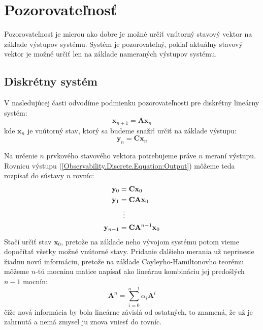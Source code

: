 \documentclass[a4paper, 10pt, ]{article}
\begin{document}
\section{Pozorovateľnosť}

Pozorovateľnosť je mierou ako dobre je možné určiť vnútorný stavový vektor na základe výstupov systému. Systém je pozorovateľný, pokiaľ aktuálny stavový vektor je možné určiť len na základe nameraných výstupov systému. 


\subsection{Diskrétny systém}

V nasledujúcej časti odvodíme podmienku pozorovateľnosti pre diskrétny lineárny systém:
\begin{equation}
    \label{Observability.Discrete.Equation:StateSpaceModel}
    \bm{x}_{n + 1} = \bm{A} \bm{x}_{n}
\end{equation}
kde $\bm{x}_{n}$ je vnútorný stav, ktorý sa budeme snažiť určiť na základe výstupu:
\begin{equation}
    \label{Observability.Discrete.Equation:Output}
    \bm{y}_n = \bm{C} \bm{x}_{n}
\end{equation}

Na určenie $n$ prvkového stavového vektora potrebujeme práve $n$ meraní výstupu. Rovnicu výstupu (\ref{Observability.Discrete.Equation:Output}) môžeme teda rozpísať do sústavy $n$ rovníc:
\begin{subequations}
    \label{Observability.Discrete.Equation:OutputSystem}
    \begin{align}
        \bm{y}_0       &= \bm{C} \bm{x}_{0}                \\
        \bm{y}_1       &= \bm{C} \bm{A} \bm{x}_{0}         \\
        &\vdotswithin{=}                                   \\
        \bm{y}_{n - 1} &= \bm{C} \bm{A}^{n - 1} \bm{x}_{0}
    \end{align}
\end{subequations}
Stačí určiť stav $\bm{x}_0$, pretože na základe neho vývojom systému potom vieme dopočítať všetky možné vnútorné stavy. Pridanie ďalšieho merania už neprinesie žiadnu novú informáciu, pretože na základe Cayleyho-Hamiltonovho teorému môžeme $n$-tú mocninu matice napísať ako lineárnu kombináciu jej predošlých $n - 1$ mocnín:
\begin{equation}
    \bm{A}^n = \sum_{i = 0}^{n - 1} \alpha_{i} \bm{A}^{i}
\end{equation}
čiže nová informácia by bola lineárne závislá od ostatných, to znamená, že už je zahrnutá a nemá zmysel ju znova vniesť do rovníc.
\end{document}
